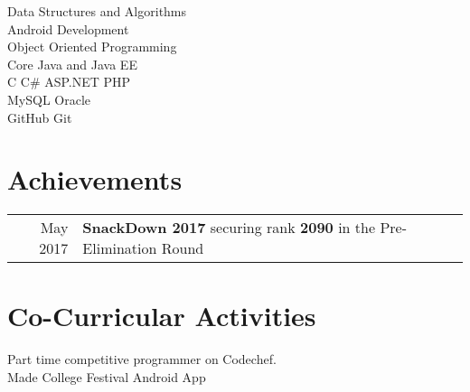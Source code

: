 \documentclass[]{denish-resume-openfont}
\begin{document}
\begin{minipage}[t]{0.69\textwidth}
\textbullet{} Data Structures and Algorithms \\
\textbullet{} Android Development \\
\textbullet{} Object Oriented Programming \\
\textbullet{} Core Java and Java EE \\
\textbullet{} C \textbullet{} C\# \textbullet{} ASP.NET \textbullet{} PHP  \\ 
\textbullet{} MySQL \textbullet{} Oracle\\
\textbullet{} GitHub \textbullet{} Git \\
\sectionsep



\section{Achievements}
\begin{tabular}{rll}
May 2017        & \textbf{SnackDown 2017} securing rank \textbf{2090} in the Pre-Elimination Round \\
\end{tabular}
\sectionsep


\section{Co-Curricular Activities}
\textbullet{} Part time competitive programmer on Codechef. \\
\textbullet{} Made College Festival Android App \\
\sectionsep

\end{minipage}
\end{document}
